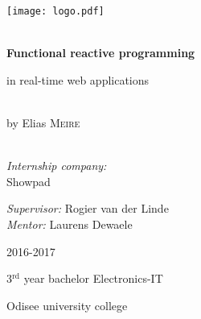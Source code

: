 \begin{titlepage}
\begin{center}
\texttt{[image: logo.pdf]}~\\[1cm]

\HRule \\[0.4cm]
{ \LARGE \bfseries Functional reactive programming
	
	 in real-time web applications }\\[0.4cm]
{by Elias \textsc{Meire}}\\[0.2cm]

\HRule \\[1.5cm]

\begin{minipage}{0.49\textwidth}
\begin{flushleft} \large
\emph{Internship company:}\\
Showpad\\

\end{flushleft}
\end{minipage}
\begin{minipage}{0.49\textwidth}
\begin{flushright} \large
\emph{Supervisor:}
Rogier van der Linde\\
\emph{Mentor:}
Laurens Dewaele\\
\end{flushright}
\end{minipage}

\vfill

{\large 2016-2017}

{\large{3$^{\text{rd}}$ year bachelor Electronics-IT}}

{\large Odisee university college}

\end{center}
\end{titlepage}
